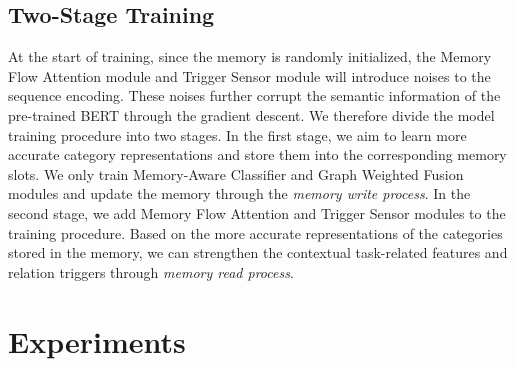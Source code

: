 \documentclass[sigconf]{acmart}
\begin{document}
\subsection{Two-Stage Training}

At the start of training, since the memory is randomly initialized, the Memory Flow Attention module and Trigger Sensor module will introduce noises to the sequence encoding. These noises further corrupt the semantic information of the pre-trained BERT \cite{devlin2018bert} through the gradient descent. We therefore divide the model training procedure into two stages. In the first stage, we aim to learn more accurate category representations and store them into the corresponding memory slots. We only train Memory-Aware Classifier and Graph Weighted Fusion modules and update the memory through the \textit{memory write process}. In the second stage, we add Memory Flow Attention and Trigger Sensor modules to the training procedure. Based on the more accurate representations of the categories stored in the memory, we can strengthen the contextual task-related features and relation triggers through \textit{memory read process}.

\section{Experiments}
\end{document}
